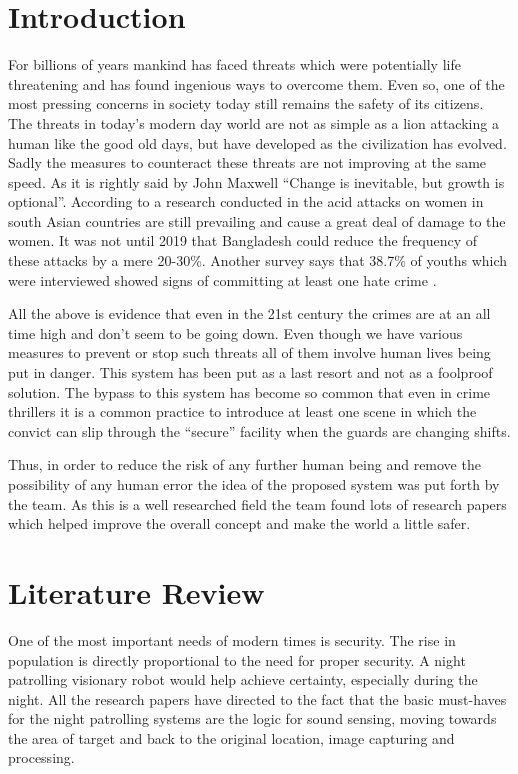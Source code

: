 \documentclass[journal]{IEEEtran}
\begin{document}
\section{Introduction}
For billions of years mankind has faced threats which were potentially
life threatening and has found ingenious ways to overcome them. Even
so, one of the most pressing concerns in society today still remains
the safety of its citizens. The threats in today's modern day world
are not as simple as a lion attacking a human like the good old days,
but have developed as the civilization has evolved. Sadly the measures
to counteract these threats are not improving at the same speed.
As it is rightly said by John Maxwell “Change is inevitable, but
growth is optional”. According to a research conducted in
\cite{[17]} the acid attacks on women in south Asian
countries are still prevailing and cause a great deal of
damage to the women. It was not until 2019 that Bangladesh
could reduce the frequency of these attacks by a mere 20-30\%.
Another survey says that 38.7\% of youths which were interviewed
showed signs of committing at least one hate crime \cite{[18]}.

All the above is evidence that even in the 21st century the crimes
are at an all time high and don't seem to be going down.
Even though we have various measures to prevent or stop such
threats all of them involve human lives being put in danger.
This system has been put as a last resort and not as a
foolproof solution. The bypass to this system has become
so common that even in crime thrillers it is a common
practice to introduce at least one scene in which the convict
can slip through the “secure” facility when the guards are
changing shifts.

Thus, in order to reduce the risk of any further human being
and remove the possibility of any human error the idea of
the proposed system was put forth by the team. As this is a
well researched field the team found lots of research papers
which helped improve the overall concept and make the world a
little safer.

\section{Literature Review}
One of the most important needs of modern times is
security. The rise in population is directly proportional
to the need for proper security. A night patrolling
visionary robot would help achieve certainty, especially
during the night. All the research papers have directed
to the fact that the basic must-haves for the night
patrolling systems are the logic for sound sensing,
moving towards the area of target and back to the
original location, image capturing and processing.
\end{document}
